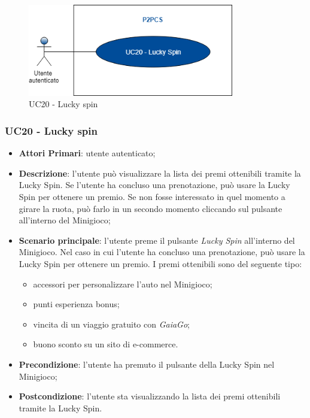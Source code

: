 \begin{figure}[h]
	\includegraphics[width=9cm]{res/images/UC20Luckyspin.png}
	\centering
	\caption{UC20 - Lucky spin}
\end{figure}
\subsubsection{UC20 - Lucky spin}
\begin{itemize}
	\item \textbf{Attori Primari}: utente autenticato;
	\item \textbf{Descrizione}:	l'utente può visualizzare la lista dei premi ottenibili tramite la Lucky Spin\glo. Se l'utente ha concluso una prenotazione, può usare la Lucky Spin per ottenere un premio. Se non fosse interessato in quel momento a girare la ruota, può farlo in un secondo momento cliccando sul pulsante all'interno del Minigioco;
	\item \textbf{Scenario principale}: l'utente preme il pulsante \textit{Lucky Spin} all'interno del Minigioco. Nel caso in cui l'utente ha concluso una prenotazione, può usare la Lucky Spin per ottenere un premio. I premi ottenibili sono del seguente tipo:
	\begin{itemize}
		\item accessori per personalizzare l'auto nel Minigioco;
		\item punti esperienza bonus;
		\item vincita di un viaggio gratuito con \textit{GaiaGo};
		\item buono sconto su un sito di e-commerce.	
	\end{itemize}
	\item \textbf{Precondizione}: l'utente ha premuto il pulsante della Lucky Spin nel Minigioco;
	\item \textbf{Postcondizione}: l'utente sta visualizzando la lista dei premi ottenibili tramite la Lucky Spin.
\end{itemize}
